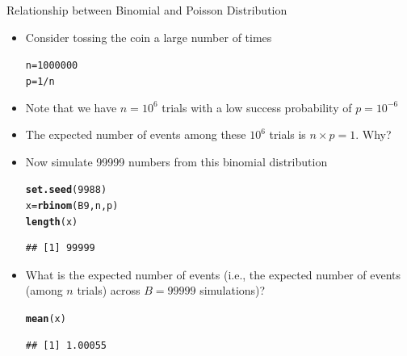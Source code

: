 \documentclass[xcolor=x11names,compress]{beamer}\usepackage[]{graphicx}\usepackage[]{color}
\makeatletter
\newcommand{\hlnum}[1]{\textcolor[rgb]{0.686,0.059,0.569}{#1}}%
\newcommand{\hlopt}[1]{\textcolor[rgb]{0,0,0}{#1}}%
\newcommand{\hlstd}[1]{\textcolor[rgb]{0.345,0.345,0.345}{#1}}%
\newcommand{\hlkwb}[1]{\textcolor[rgb]{0.69,0.353,0.396}{#1}}%
\newcommand{\hlkwd}[1]{\textcolor[rgb]{0.737,0.353,0.396}{\textbf{#1}}}%
\newenvironment{kframe}{%
 \def\at@end@of@kframe{}%
 \ifinner\ifhmode%
  \def\at@end@of@kframe{\end{minipage}}%
  \begin{minipage}{\columnwidth}%
 \fi\fi%
 \def\FrameCommand##1{\hskip\@totalleftmargin \hskip-\fboxsep
 \colorbox{shadecolor}{##1}\hskip-\fboxsep
     \hskip-\linewidth \hskip-\@totalleftmargin \hskip\columnwidth}%
 \MakeFramed {\advance\hsize-\width
   \@totalleftmargin\z@ \linewidth\hsize
   \@setminipage}}%
 {\par\unskip\endMakeFramed%
 \at@end@of@kframe}
\newenvironment{knitrout}{}{} %
\makeatother
\begin{document}
\begin{frame}[fragile]{Relationship between Binomial and Poisson Distribution}
  \begin{itemize}
  \item Consider tossing the coin a large number of times
\begin{knitrout}\tiny
{}\color{fgcolor}\begin{kframe}
\begin{alltt}
\hlstd{n}\hlkwb{=}\hlnum{1000000}
\hlstd{p}\hlkwb{=}\hlnum{1}\hlopt{/}\hlstd{n}
\end{alltt}
\end{kframe}
\end{knitrout}
\item Note that we have $n=\ensuremath{10^{6}}$ trials with a low success probability
  of $p=\ensuremath{10^{-6}}$
\item The expected number of events among these \ensuremath{10^{6}} trials is
  $n\times p=1$. Why?

\item Now simulate 99999 numbers from this binomial distribution
\begin{knitrout}\tiny
{}\color{fgcolor}\begin{kframe}
\begin{alltt}
\hlkwd{set.seed}\hlstd{(}\hlnum{9988}\hlstd{)}
\hlstd{x}\hlkwb{=}\hlkwd{rbinom}\hlstd{(B9,n,p)}
\hlkwd{length}\hlstd{(x)}
\end{alltt}
\begin{verbatim}
## [1] 99999
\end{verbatim}
\end{kframe}
\end{knitrout}
\item What is the expected number of events (i.e., the expected number of 
  events (among $n$ trials) across $B=99999$ simulations)?
\begin{knitrout}\tiny
{}\color{fgcolor}\begin{kframe}
\begin{alltt}
\hlkwd{mean}\hlstd{(x)}
\end{alltt}
\begin{verbatim}
## [1] 1.00055
\end{verbatim}
\end{kframe}
\end{knitrout}

\end{itemize}
\end{frame}
\end{document}
